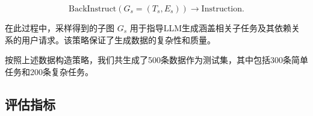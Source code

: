 \[
\text{BackInstruct}(G_s = (T_s, E_s)) \rightarrow \text{Instruction}.
\]

在此过程中，采样得到的子图 \( G_s \) 用于指导LLM生成涵盖相关子任务及其依赖关系的用户请求。该策略保证了生成数据的复杂性和质量。

按照上述数据构造策略，我们共生成了500条数据作为测试集，其中包括300条简单任务和200条复杂任务。









\subsection{评估指标}

